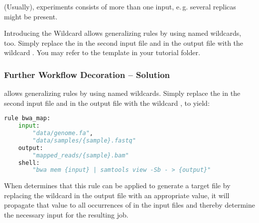 \begin{frame}[fragile]
  \frametitle{}
  (Usually), experiments consists of more than one input, e.\,g. several replicas might be present.\newline
  \begin{task}{Introducing the  Wildcard}
    \Snakemake{} allows generalizing rules by using named wildcards, too. Simply replace the  in the second input file and in the output file with the wildcard .\newline
    You may refer to the  template in your tutorial folder.
  \end{task}
\end{frame}

\begin{frame}[fragile]
  \frametitle{Further Workflow Decoration -- Solution} 
  \footnotesize 
  \Snakemake{} allows generalizing rules by using named wildcards. Simply replace the  in the second input file and in the output file with the wildcard , to yield:
  \begin{lstlisting}[language=Python,style=Python,basicstyle=\footnotesize]
rule bwa_map:
    input:
        "data/genome.fa",
        "data/samples/{sample}.fastq"
    output:
        "mapped_reads/{sample}.bam"
    shell:
        "bwa mem {input} | samtools view -Sb - > {output}"
  \end{lstlisting}
  When \Snakemake{} determines that this rule can be applied to generate a target file by replacing the wildcard  in the output file with an appropriate value, it will propagate that value to all occurrences of  in the input files and thereby determine the necessary input for the resulting job. 
\end{frame}

